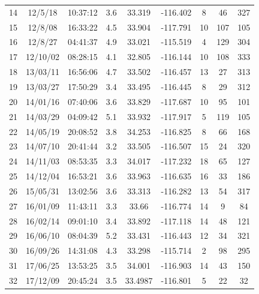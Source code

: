 {\begin{table}[!ht]
{\begin{tabular}{@{}ccccccccc@{}}
      14                       & 12/5/18  & 10:37:12 & 3.6 & 33.319  & -116.402 & 8  & 46  & 327 \\
      15                       & 12/8/08  & 16:33:22 & 4.5 & 33.904  & -117.791 & 10 & 107 & 105 \\
      16                       & 12/8/27  & 04:41:37 & 4.9 & 33.021  & -115.519 & 4  & 129 & 304 \\
      17                       & 12/10/02 & 08:28:15 & 4.1 & 32.805  & -116.144 & 10 & 108 & 333 \\
      18                       & 13/03/11 & 16:56:06 & 4.7 & 33.502  & -116.457 & 13 & 27  & 313 \\
      19                       & 13/03/27 & 17:50:29 & 3.4 & 33.495  & -116.445 & 8  & 29  & 312 \\
      20                       & 14/01/16 & 07:40:06 & 3.6 & 33.829  & -117.687 & 10 & 95  & 101 \\
      21                       & 14/03/29 & 04:09:42 & 5.1 & 33.932  & -117.917 & 5  & 119 & 105 \\
      22                       & 14/05/19 & 20:08:52 & 3.8 & 34.253  & -116.825 & 8  & 66  & 168 \\
      23                       & 14/07/10 & 20:41:44 & 3.2 & 33.505  & -116.507 & 15 & 24  & 320 \\
      24                       & 14/11/03 & 08:53:35 & 3.3 & 34.017  & -117.232 & 18 & 65  & 127 \\
      25                       & 14/12/04 & 16:53:21 & 3.6 & 33.963  & -116.635 & 16 & 33  & 186 \\
      26                       & 15/05/31 & 13:02:56 & 3.6 & 33.313  & -116.282 & 13 & 54  & 317 \\
      27                       & 16/01/09 & 11:43:11 & 3.3 & 33.66   & -116.774 & 14 & 9   & 84  \\
      28                       & 16/02/14 & 09:01:10 & 3.4 & 33.892  & -117.118 & 14 & 48  & 121 \\
      29                       & 16/06/10 & 08:04:39 & 5.2 & 33.431  & -116.443 & 12 & 34  & 321 \\
      30                       & 16/09/26 & 14:31:08 & 4.3 & 33.298  & -115.714 & 2  & 98  & 295 \\
      31                       & 17/06/25 & 13:53:25 & 3.5 & 34.001  & -116.903 & 14 & 43  & 150 \\
      32                       & 17/12/09 & 20:45:24 & 3.5 & 33.4987 & -116.801 & 5  & 22  & 32  \\

\end{tabular}}
\end{table}}
